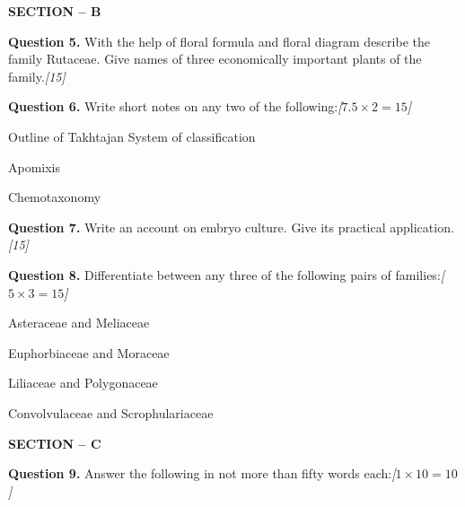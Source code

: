 \documentclass[11pt,a4paper]{article}
\newcommand{\pts}[1]{\hfill   \textit{[#1]}}
\begin{document}
\bigskip

\begin{center}
   \textbf{SECTION -- B}
\end{center}

\medskip


\noindent   \textbf{Question 5.} With the help of floral formula and floral diagram describe the family Rutaceae. Give names of three economically important plants of the family.\pts{15}

\medskip


\noindent   \textbf{Question 6.} Write short notes on any two of the following:\pts{$7.5  \times 2 = 15$}

\begin{parts}
  \item Outline of Takhtajan System of classification
  \item Apomixis
  \item Chemotaxonomy
\end{parts}

\medskip


\noindent   \textbf{Question 7.} Write an account on embryo culture. Give its practical application.\pts{15}

\medskip


\noindent   \textbf{Question 8.} Differentiate between any three of the following pairs of families:\pts{$5  \times 3 = 15$}

\begin{parts}
  \item Asteraceae and Meliaceae
  \item Euphorbiaceae and Moraceae
  \item Liliaceae and Polygonaceae
  \item Convolvulaceae and Scrophulariaceae
\end{parts}

\bigskip

\begin{center}
   \textbf{SECTION -- C}
\end{center}

\medskip


\noindent   \textbf{Question 9.} Answer the following in not more than fifty words each:\pts{$1  \times 10 = 10$}
\end{document}
